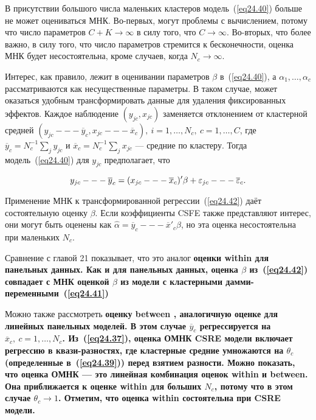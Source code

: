 В присутствии большого числа маленьких кластеров модель~(\ref{eq24.40}) больше не может оцениваться МНК. Во-первых, могут проблемы с вычислением, потому что число параметров $C+K \to \infty$ в силу того, что $C \to \infty$. Во-вторых, что более важно, в силу того, что число параметров стремится к бесконечности, оценка МНК будет несостоятельна, кроме случаев, когда $N_c \to \infty$. 

Интерес, как правило, лежит в оценивании параметров $\beta$ в~(\ref{eq24.40}), а $\alpha_1 , \dots, \alpha_c$ рассматриваются как несущественные параметры. В таком случае, может оказаться удобным трансформировать данные для удаления фиксированных эффектов. Каждое наблюдение $(y_{jc}, x_{jc})$ заменяется отклонением от кластерной средней $(y_{jc} --- \overline{y}_c, x_{jc} --- \overline{x}_c), \: i = 1, \dots, N_c, \: c = 1, \dots, C$, где $\overline{y}_c = N_c^{-1} \sum_j y_{jc}$ и $\overline{x}_c = N_c^{-1} \sum_j x_{jc}$ --- средние по кластеру. Тогда модель~(\ref{eq24.40}) для $y_{jc}$ предполагает, что

\begin{equation}
\label{eq24.42}
y_{jc} --- \overline{y}_c = (x_{jc} --- \overline{x}_c)' \beta + \varepsilon_{jc} --- \overline{\varepsilon}_c.
\end{equation}

Применение МНК к трансформированной регрессии~(\ref{eq24.42}) даёт состоятельную оценку $\beta$. Если коэффициенты CSFE также представляют интерес, они могут быть оценены как $\hat \alpha = \overline{y}_c --- \overline{x}'_c \beta$, но эта оценка несостоятельна при маленьких $N_c$. 

Сравнение с главой 21 показывает, что это аналог \bfseries оценки within \mdseries для панельных данных. Как и для панельных данных, оценка $\beta$ из~(\ref{eq24.42}) совпадает с МНК оценкой $\beta$ из модели с кластерными дамми-переменными~(\ref{eq24.41})

Можно также рассмотреть \bfseries оценку between \mdseries, аналогичную оценке для линейных панельных моделей. В этом случае $\overline{y}_c$ регрессируется на $\overline{x}_c, \: c = 1, \dots , N_c$. Из~(\ref{eq24.37}), оценка ОМНК CSRE модели включает регрессию в квази-разностях, где кластерные средние умножаются на $\theta_c$ (определенные в~(\ref{eq24.39})) перед взятием разности. Можно показать, что оценка ОМНК --- это линейная комбинация оценок within и between. Она приближается к оценке within для больших $N_c$, потому что в этом случае $\theta_c \to 1$. Отметим, что оценка within состоятельна при CSRE модели. 

